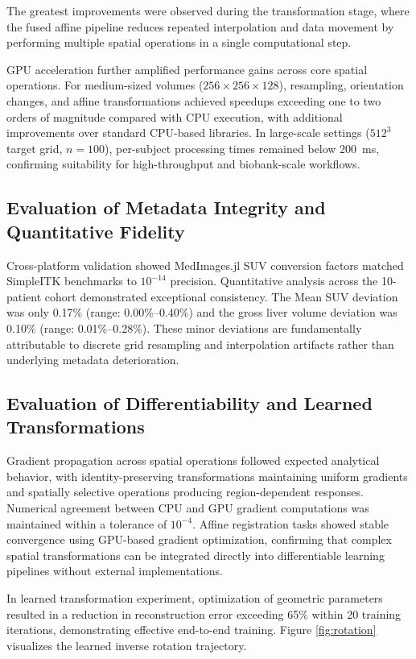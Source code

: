 \documentclass[a4paper,10pt,preprint]{elsarticle}
\begin{document}
The greatest improvements were observed during the transformation stage, where the fused affine pipeline reduces repeated interpolation and data movement by performing multiple spatial operations in a single computational step. 

GPU acceleration further amplified performance gains across core spatial operations. For medium-sized volumes ($256 \times 256 \times 128$), resampling, orientation changes, and affine transformations achieved speedups exceeding one to two orders of magnitude compared with CPU execution, with additional improvements over standard CPU-based libraries. In large-scale settings ($512^3$ target grid, $n=100$), per-subject processing times remained below 200~ms, confirming suitability for high-throughput and biobank-scale workflows.

\subsection*{Evaluation of Metadata Integrity and Quantitative Fidelity}
Cross-platform validation showed MedImages.jl SUV conversion factors matched SimpleITK benchmarks to $10^{-14}$ precision. Quantitative analysis across the 10-patient cohort demonstrated exceptional consistency. The Mean SUV deviation was only\textbf{ }0.17\% (range: 0.00\%--0.40\%) and the gross liver volume deviation was 0.10\% (range: 0.01\%--0.28\%). These minor deviations are fundamentally attributable to discrete grid resampling and interpolation artifacts rather than underlying metadata deterioration. 


\subsection*{Evaluation of Differentiability and Learned Transformations}
Gradient propagation across spatial operations followed expected analytical behavior, with identity-preserving transformations maintaining uniform gradients and spatially selective operations producing region-dependent responses. Numerical agreement between CPU and GPU gradient computations was maintained within a tolerance of $10^{-4}$. Affine registration tasks showed stable convergence using GPU-based gradient optimization, confirming that complex spatial transformations can be integrated directly into differentiable learning pipelines without external implementations. 

In learned transformation experiment, optimization of geometric parameters resulted in a reduction in reconstruction error exceeding 65\% within 20 training iterations, demonstrating effective end-to-end training. Figure \ref{fig:rotation} visualizes the learned inverse rotation trajectory.
\end{document}
